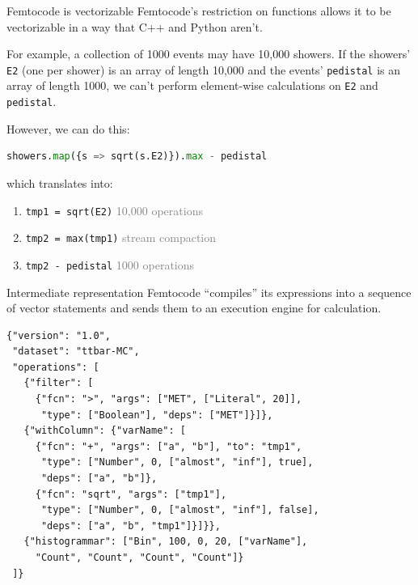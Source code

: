 \documentclass{beamer}
\begin{document}
\begin{frame}[fragile]{Femtocode is vectorizable}
\vspace{0.5 cm}
Femtocode's restriction on functions allows it to be vectorizable in a way that C++ and Python aren't.

\vspace{0.25 cm}
For example, a collection of 1000 events may have 10,000 showers. If the showers' {\small\tt E2} (one per shower) is an array of length 10,000 and the events' {\small\tt pedistal} is an array of length 1000, we can't perform element-wise calculations on {\small\tt E2} and {\small\tt pedistal}.

\vspace{0.25 cm}
However, we can do this:

\vspace{-0.25 cm}
\begin{center}
\begin{minipage}{0.9\linewidth}
\small
\begin{lstlisting}[language=python]
showers.map({s => sqrt(s.E2)}).max - pedistal
\end{lstlisting}
\end{minipage}
\end{center}

\vspace{-0.25 cm}
which translates into:
\begin{enumerate}
\item {\small\tt tmp1 = sqrt(E2)} \hfill \textcolor{gray}{10,000 operations}
\item {\small\tt tmp2 = max(tmp1)} \hfill \textcolor{gray}{stream compaction}
\item {\small\tt tmp2 - pedistal} \hfill \textcolor{gray}{1000 operations}
\end{enumerate}
\end{frame}

\begin{frame}[fragile]{Intermediate representation}
\vspace{0.4 cm}
Femtocode ``compiles'' its expressions into a sequence of vector statements and sends them to an execution engine for calculation.

\small
\begin{verbatim}
{"version": "1.0",
 "dataset": "ttbar-MC",
 "operations": [
   {"filter": [
     {"fcn": ">", "args": ["MET", ["Literal", 20]],
      "type": ["Boolean"], "deps": ["MET"]}]},
   {"withColumn": {"varName": [
     {"fcn": "+", "args": ["a", "b"], "to": "tmp1",
      "type": ["Number", 0, ["almost", "inf"], true],
      "deps": ["a", "b"]},
     {"fcn": "sqrt", "args": ["tmp1"],
      "type": ["Number", 0, ["almost", "inf"], false],
      "deps": ["a", "b", "tmp1"]}]}},
   {"histogrammar": ["Bin", 100, 0, 20, ["varName"],
     "Count", "Count", "Count", "Count"]}
 ]}
\end{verbatim}
\end{frame}
\end{document}
